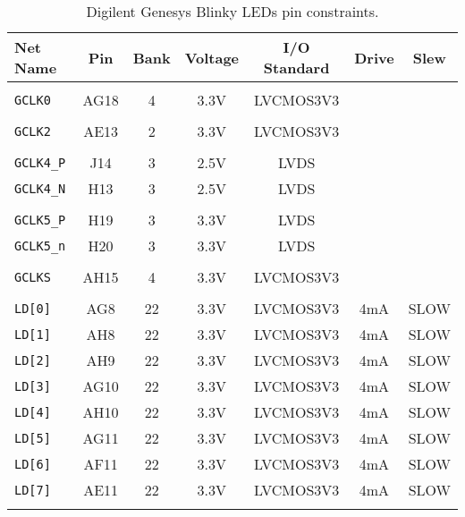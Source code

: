 %
\begin{table}[t]
\caption{Digilent Genesys Blinky LEDs pin constraints.}
\label{tab:blinky_pins}
\begin{center}
\begin{tabular}{|l||c|c|c|c|c|c|}
\hline
Net Name       & Pin & Bank & Voltage & I/O Standard & Drive & Slew\\
\hline\hline
&&&&&&\\
\verb+GCLK0+   & AG18 &   4 & 3.3V & LVCMOS3V3 &&\\
&&&&&&\\
\verb+GCLK2+   & AE13 &   2 & 3.3V & LVCMOS3V3 &&\\
&&&&&&\\
\verb+GCLK4_P+ & J14  &   3 & 2.5V & LVDS &&\\
\verb+GCLK4_N+ & H13  &   3 & 2.5V & LVDS &&\\
&&&&&&\\
\verb+GCLK5_P+ & H19  &   3 & 3.3V & LVDS &&\\
\verb+GCLK5_n+ & H20  &   3 & 3.3V & LVDS &&\\
&&&&&&\\
\verb+GCLKS+   & AH15 &   4 & 3.3V & LVCMOS3V3 &&\\
&&&&&&\\
\verb+LD[0]+   & AG8  &  22 & 3.3V & LVCMOS3V3 & 4mA & SLOW\\
\verb+LD[1]+   & AH8  &  22 & 3.3V & LVCMOS3V3 & 4mA & SLOW\\
\verb+LD[2]+   & AH9  &  22 & 3.3V & LVCMOS3V3 & 4mA & SLOW\\
\verb+LD[3]+   & AG10 &  22 & 3.3V & LVCMOS3V3 & 4mA & SLOW\\
\verb+LD[4]+   & AH10 &  22 & 3.3V & LVCMOS3V3 & 4mA & SLOW\\
\verb+LD[5]+   & AG11 &  22 & 3.3V & LVCMOS3V3 & 4mA & SLOW\\
\verb+LD[6]+   & AF11 &  22 & 3.3V & LVCMOS3V3 & 4mA & SLOW\\
\verb+LD[7]+   & AE11 &  22 & 3.3V & LVCMOS3V3 & 4mA & SLOW\\
&&&&&&\\
\hline
\end{tabular}
\end{center}
\end{table}
